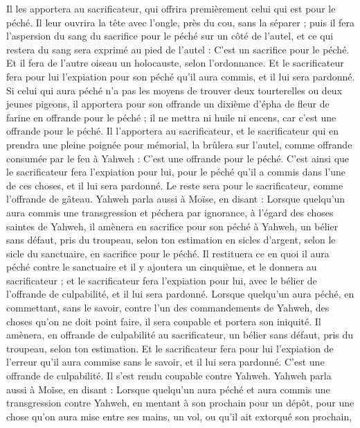 \begin{multicols}{2}
Il les apportera au sacrificateur, qui offrira premièrement celui qui est pour le péché. Il leur ouvrira la tête avec l'ongle, près du cou, sans la séparer ;
puis il fera l’aspersion du sang du sacrifice pour le péché sur un côté de l'autel, et ce qui restera du sang sera exprimé au pied de l'autel : C'est un sacrifice pour le péché.
Et il fera de l’autre oiseau un holocauste, selon l'ordonnance. Et le sacrificateur fera pour lui l’expiation pour son péché qu'il aura commis, et il lui sera pardonné.
Si celui qui aura péché n’a pas les moyens de trouver deux tourterelles ou deux jeunes pigeons, il apportera pour son offrande un dixième d'épha de fleur de farine en offrande pour le péché ; il ne mettra ni huile ni encens, car c'est une offrande pour le péché.
Il l'apportera au sacrificateur, et le sacrificateur qui en prendra une pleine poignée pour mémorial, la brûlera sur l'autel, comme offrande consumée par le feu à Yahweh : C'est une offrande pour le péché.
C’est ainsi que le sacrificateur fera l’expiation pour lui, pour le péché qu'il a commis dans l'une de ces choses, et il lui sera pardonné. Le reste sera pour le sacrificateur, comme l’offrande de gâteau.
Yahweh parla aussi à Moïse, en disant :
Lorsque quelqu'un aura commis une transgression et péchera par ignorance, à l’égard des choses saintes de Yahweh, il amènera en sacrifice pour son péché à Yahweh, un bélier sans défaut, pris du troupeau, selon ton estimation en sicles d'argent, selon le sicle du sanctuaire, en sacrifice pour le péché.
Il restituera ce en quoi il aura péché contre le sanctuaire et il y ajoutera un cinquième, et le donnera au sacrificateur ; et le sacrificateur fera l’expiation pour lui, avec le bélier de l’offrande de culpabilité, et il lui sera pardonné.
Lorsque quelqu'un aura péché, en commettant, sans le savoir, contre l’un des commandements de Yahweh, des choses qu'on ne doit point faire, il sera coupable et portera son iniquité.
Il amènera, en offrande de culpabilité au sacrificateur, un bélier sans défaut, pris du troupeau, selon ton estimation. Et le sacrificateur fera pour lui l’expiation de l’erreur qu'il aura commise sans le savoir, et il lui sera pardonné.
C’est une offrande de culpabilité. Il s'est rendu coupable contre Yahweh.
Yahweh parla aussi à Moïse, en disant :
Lorsque quelqu’un aura péché et aura commis une transgression contre Yahweh, en mentant à son prochain pour un dépôt, pour une chose qu'on aura mise entre ses mains, un vol, ou qu'il ait extorqué son prochain,

\end{multicols}
